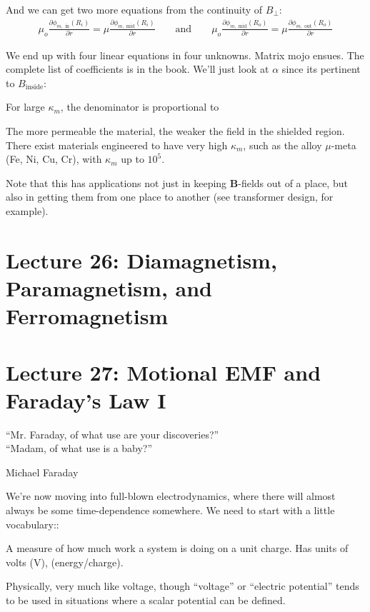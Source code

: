 \documentclass{article}
\numberwithin{equation}{section}
\begin{document}
And we can get two more equations from the continuity of $B_{\perp}$:
\begin{gather*}
    \mu_o \frac{\partial \phi_{m, \text{ in}} (R_i)}{\partial r} = \mu \frac{\partial \phi_{m, \text{ mid}} (R_i)}{\partial r} \qquad \text{and} \qquad \mu_o \frac{\partial \phi_{m, \text{ mid}} (R_o)}{\partial r} = \mu \frac{\partial \phi_{m, \text{ out}} (R_o)}{\partial r}
\end{gather*}

We end up with four linear equations in four unknowns. Matrix mojo ensues. The complete list of coefficients is in the book. We'll just look at $\alpha$ since its pertinent to $B_{\text{inside}}$:

For large $\kappa_m$, the denominator is proportional to

The more permeable the material, the weaker the field in the shielded region. There exist materials engineered to have very high $\kappa_m$, such as the alloy $\mu$-meta (Fe, Ni, Cu, Cr), with $\kappa_m$ up to $10^5$.

Note that this has applications not just in keeping $\bm{B}$-fields out of a place, but also in getting them from one place to another (see transformer design, for example).

\newpage

\section*{Lecture 26: Diamagnetism, Paramagnetism, and Ferromagnetism}
\setcounter{page}{1}

\newpage

\section*{Lecture 27: Motional EMF and Faraday's Law I}
\setcounter{page}{1}

\epigraph{``Mr. Faraday, of what use are your discoveries?'' \\ ``Madam, of what use is a baby?''}{Michael Faraday}

We're now moving into full-blown electrodynamics, where there will almost always be some time-dependence somewhere. We need to start with a little vocabulary::

\begin{mdframed}[backgroundcolor=WHITE,align=left,userdefinedwidth=45em, topline=false, rightline=false,frametitle={Electromotive Force (emf)}]

A measure of how much work a system is doing on a unit charge. Has units of volts (V), (energy/charge).

Physically, very much like voltage, though ``voltage'' or ``electric potential'' tends to be used in situations where a scalar potential can be defined.

\end{mdframed}
\end{document}
